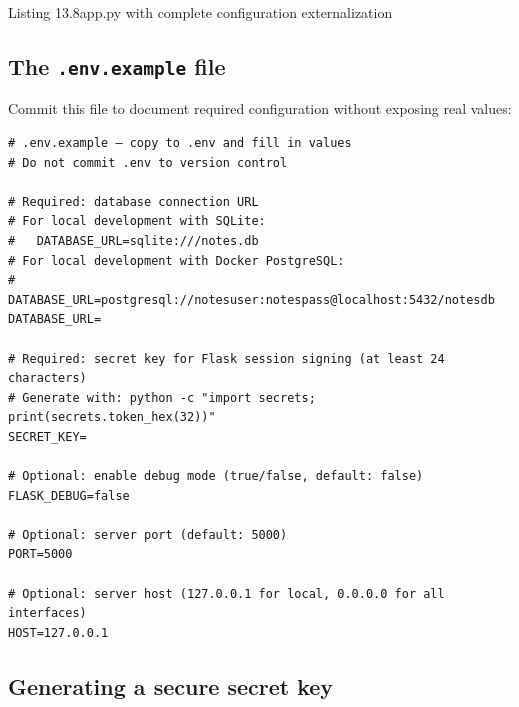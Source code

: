 \begin{codeboxcap}{\textcolor{accent}{Listing 13.8}\enspace app.py with complete configuration externalization}
\begin{Shaded}
\begin{Highlighting}[]

  \OperatorTok{==} \NormalTok{:}
\OperatorTok{=}\NormalTok{CONFIG[}\NormalTok{],}
\OperatorTok{=}\NormalTok{CONFIG[}\NormalTok{],}
\OperatorTok{=}\NormalTok{CONFIG[}\NormalTok{]}
\NormalTok{    )}
\end{Highlighting}
\end{Shaded}

\end{codeboxcap}

\subsection*{\texorpdfstring{The \texttt{.env.example} file}{The .env.example file}}\label{13-configuration-externalization:the-envexample-file}

Commit this file to document required configuration without exposing real values:

\begin{outputbox}
\begin{Verbatim}[fontsize=\codesize, breaklines, breakanywhere, breaksymbolleft={\tiny\textcolor{muted}{$\hookrightarrow$}}]
# .env.example — copy to .env and fill in values
# Do not commit .env to version control

# Required: database connection URL
# For local development with SQLite:
#   DATABASE_URL=sqlite:///notes.db
# For local development with Docker PostgreSQL:
#   DATABASE_URL=postgresql://notesuser:notespass@localhost:5432/notesdb
DATABASE_URL=

# Required: secret key for Flask session signing (at least 24 characters)
# Generate with: python -c "import secrets; print(secrets.token_hex(32))"
SECRET_KEY=

# Optional: enable debug mode (true/false, default: false)
FLASK_DEBUG=false

# Optional: server port (default: 5000)
PORT=5000

# Optional: server host (127.0.0.1 for local, 0.0.0.0 for all interfaces)
HOST=127.0.0.1
\end{Verbatim}
\end{outputbox}

\subsection*{Generating a secure secret key}\label{13-configuration-externalization:generating-a-secure-secret-key}

